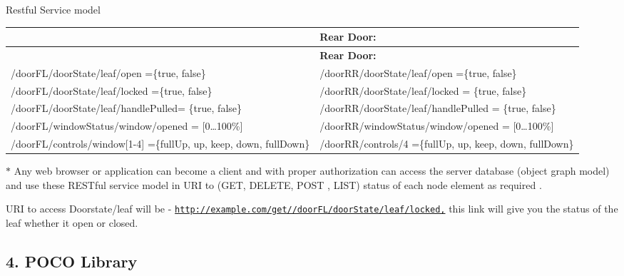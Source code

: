 \begin{DoxyItemize}
\item Restful Service model \tabulinesep=1mm
\begin{longtabu} spread 0pt [c]{*2{|X[-1]}|}
\hline
{}&{\bf Rear Door\+:  }\\
\endfirsthead
\hline
\endfoot
\hline
{}&{\bf Rear Door\+:  }\\
\endhead
/door\+F\+L/door\+State/leaf/open =\{true, false\} &/door\+R\+R/door\+State/leaf/open =\{true, false\} \\
/door\+F\+L/door\+State/leaf/locked =\{true, false\} &/door\+R\+R/door\+State/leaf/locked = \{true, false\} \\
/door\+F\+L/door\+State/leaf/handle\+Pulled= \{true, false\} &/door\+R\+R/door\+State/leaf/handle\+Pulled = \{true, false\} \\
/door\+F\+L/window\+Status/window/opened = \mbox{[}0…100\%\mbox{]} &/door\+R\+R/window\+Status/window/opened = \mbox{[}0…100\%\mbox{]} \\
/door\+F\+L/controls/window\mbox{[}1-\/4\mbox{]} =\{full\+Up, up, keep, down, full\+Down\} &/door\+R\+R/controls/4 =\{full\+Up, up, keep, down, full\+Down\} \\
\end{longtabu}
$\ast$ Any web browser or application can become a client and with proper authorization can access the server database (object graph model) and use these R\+E\+S\+Tful service model in U\+RI to (G\+ET, D\+E\+L\+E\+TE, P\+O\+ST , L\+I\+ST) status of each node element as required .
\item U\+RI to access Doorstate/leaf will be -\/ \href{http://example.com/get//doorFL/doorState/leaf/locked,}{\tt http\+://example.\+com/get//door\+F\+L/door\+State/leaf/locked,} this link will give you the status of the leaf whether it open or closed.
\end{DoxyItemize}

\subsection*{4. P\+O\+CO Library}


